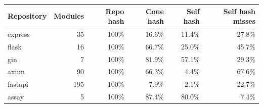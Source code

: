 \begin{tabular}{lrrrrr}
\toprule
Repository & Modules & Repo hash & Cone hash & Self hash & Self hash misses \\
\midrule
express & 35 & 100\% & 16.6\% & 11.4\% & 27.8\% \\
flask & 16 & 100\% & 66.7\% & 25.0\% & 45.7\% \\
gin & 7 & 100\% & 81.9\% & 57.1\% & 29.3\% \\
axum & 90 & 100\% & 66.3\% & 4.4\% & 67.6\% \\
fastapi & 195 & 100\% & 7.9\% & 2.1\% & 22.7\% \\
assay & 5 & 100\% & 87.4\% & 80.0\% & 7.4\% \\
\bottomrule
\end{tabular}
